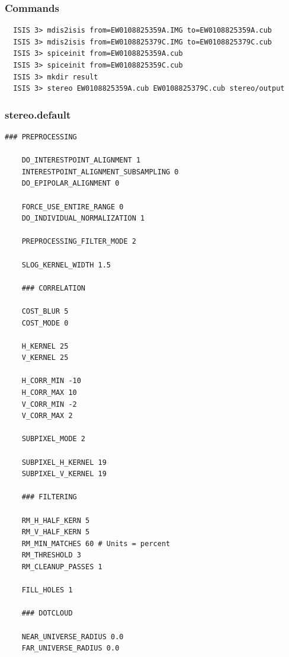 \subsubsection*{Commands}

\begin{verbatim}
  ISIS 3> mdis2isis from=EW0108825359A.IMG to=EW0108825359A.cub
  ISIS 3> mdis2isis from=EW0108825379C.IMG to=EW0108825379C.cub
  ISIS 3> spiceinit from=EW0108825359A.cub
  ISIS 3> spiceinit from=EW0108825359C.cub
  ISIS 3> mkdir result
  ISIS 3> stereo EW0108825359A.cub EW0108825379C.cub stereo/output
\end{verbatim}

\subsubsection*{stereo.default}

\begin{center}\begin{minipage}{5.5in}
\begin{Verbatim}[frame=single,fontsize=\small,label=stereo.default for MDIS]
    ### PREPROCESSING

    DO_INTERESTPOINT_ALIGNMENT 1
    INTERESTPOINT_ALIGNMENT_SUBSAMPLING 0
    DO_EPIPOLAR_ALIGNMENT 0

    FORCE_USE_ENTIRE_RANGE 0
    DO_INDIVIDUAL_NORMALIZATION 1

    PREPROCESSING_FILTER_MODE 2

    SLOG_KERNEL_WIDTH 1.5

    ### CORRELATION

    COST_BLUR 5
    COST_MODE 0

    H_KERNEL 25
    V_KERNEL 25

    H_CORR_MIN -10
    H_CORR_MAX 10
    V_CORR_MIN -2
    V_CORR_MAX 2

    SUBPIXEL_MODE 2

    SUBPIXEL_H_KERNEL 19
    SUBPIXEL_V_KERNEL 19

    ### FILTERING

    RM_H_HALF_KERN 5
    RM_V_HALF_KERN 5
    RM_MIN_MATCHES 60 # Units = percent
    RM_THRESHOLD 3
    RM_CLEANUP_PASSES 1

    FILL_HOLES 1

    ### DOTCLOUD

    NEAR_UNIVERSE_RADIUS 0.0
    FAR_UNIVERSE_RADIUS 0.0
\end{Verbatim}
\end{minipage}\end{center}


